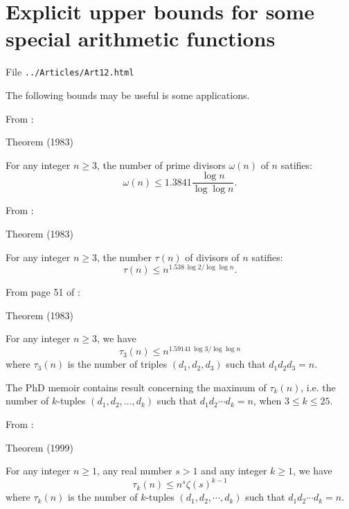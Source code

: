 \chapter{  Explicit upper bounds for some special arithmetic functions}

File \texttt{../Articles/Art12.html}










 
 

The following bounds may be useful is some applications.

From \cite{Robin*83-1}:

\begin{thm}{Theorem (1983)}

For any integer $n\ge3$, the number of prime divisors $\omega(n)$ of $n$ satifies:
  $$\omega(n)\le 1.3841\frac{\log n}{\log\log n}.$$
\end{thm}


From \cite{Nicolas-Robin*83}:

\begin{thm}{Theorem (1983)}

For any integer $n\ge3$, the number $\tau(n)$  of divisors of $n$ satifies:
  $$\tau(n)\le n^{1.538\,\log 2/\log\log n}.$$
\end{thm}


From page 51 of \cite{Robin*83-0}:

\begin{thm}{Theorem (1983)}

For any integer $n\ge3$, we have
  $$\tau_3(n)\le n^{1.59141\,\log 3/\log\log n}$$
  where $\tau_3(n)$ is the number of triples $(d_1,d_2,d_3)$ such that $d_1d_2d_3=n$.
\end{thm}

The PhD memoir \cite{Duras*93} contains result concerning the maximum
of $\tau_k(n)$, i.e. the number of $k$-tuples $(d_1,d_2,\ldots, d_k)$
such that $d_1d_2\cdots d_k=n$, when $3\le k\le 25$.

From \cite{Duras-Nicolas-Robin*99}:

\begin{thm}{Theorem (1999)}

For any integer $n\ge1$, any real number $s>1$ and any integer $k\ge1$, we have
  $$\tau_k(n)\le n^s\zeta(s)^{k-1}$$
  where $\tau_k(n)$ is the number of $k$-tuples $(d_1,d_2,\cdots,d_k)$ such
  that $d_1d_2\cdots d_k=n$.
\end{thm}

